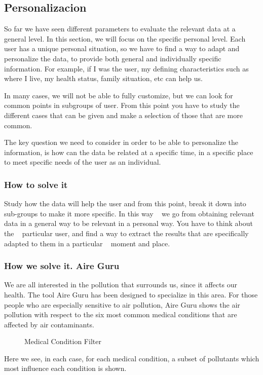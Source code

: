 \subsection{Personalizacion}
So far we have seen different parameters to evaluate the relevant data at a general level. In this section, we will focus on the specific personal level.
Each user has a unique personal situation, so we have to find a way to adapt and personalize the data, to provide both general and individually specific information.
For example, if I was the user, my defining characteristics such as where I live,
my health status, family situation, etc can help us.

In many cases, we will not be able to fully customize, but we can look for common points in subgroups of
user. From this point you have to study the different cases that can be given and make a selection of those that are
more common.

The key question we need to consider in order to be able to personalize the information, is how can the data be related at a specific time, in a specific place to meet specific needs of the
user as an individual.

\subsubsection{How to solve it} 

Study how the data will help the user and from this point, break it down into sub-groups to make it more specific. In this way
  we go from obtaining relevant data in a general way to be relevant in a personal way. You have to think about the
  particular user, and find a way to extract the results that are specifically adapted to them in a particular
  moment and place.

\subsubsection{How we solve it. Aire Guru} 
 We are all interested in the pollution that surrounds us, since it affects our health. The tool
 Aire Guru has been designed to specialize in this area. For those people who are especially sensitive to air pollution, Aire Guru shows the air pollution with respect to the six most common medical conditions that
 are affected by air contaminants.
 

\begin{figure}[ht]
    \centering
    \hfill
    \hfill
  
  \caption{Medical Condition Filter}
    \end{figure}
  Here we see, in each case, for each medical condition, a subset of pollutants which most influence each condition is shown.
    
